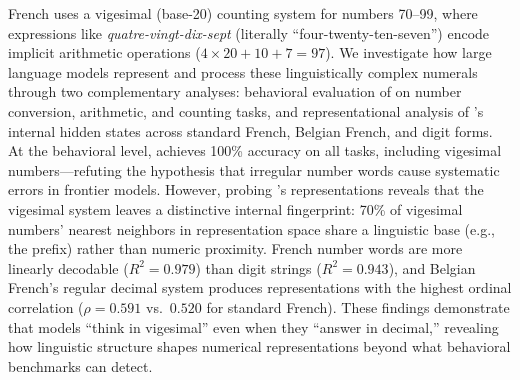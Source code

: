 French uses a vigesimal (base-20) counting system for numbers 70--99, where expressions like \emph{quatre-vingt-dix-sept} (literally ``four-twenty-ten-seven'') encode implicit arithmetic operations ($4 \times 20 + 10 + 7 = 97$).
We investigate how large language models represent and process these linguistically complex numerals through two complementary analyses: behavioral evaluation of \gptmodel on number conversion, arithmetic, and counting tasks, and representational analysis of \mistral's internal hidden states across standard French, Belgian French, and digit forms.
At the behavioral level, \gptmodel achieves 100\% accuracy on all tasks, including vigesimal numbers---refuting the hypothesis that irregular number words cause systematic errors in frontier models.
However, probing \mistral's representations reveals that the vigesimal system leaves a distinctive internal fingerprint: 70\% of vigesimal numbers' nearest neighbors in representation space share a linguistic base (e.g., the \quatrevingt prefix) rather than numeric proximity.
French number words are more linearly decodable ($R^2 = 0.979$) than digit strings ($R^2 = 0.943$), and Belgian French's regular decimal system produces representations with the highest ordinal correlation ($\rho = 0.591$ vs.\ $0.520$ for standard French).
These findings demonstrate that models ``think in vigesimal'' even when they ``answer in decimal,'' revealing how linguistic structure shapes numerical representations beyond what behavioral benchmarks can detect.
